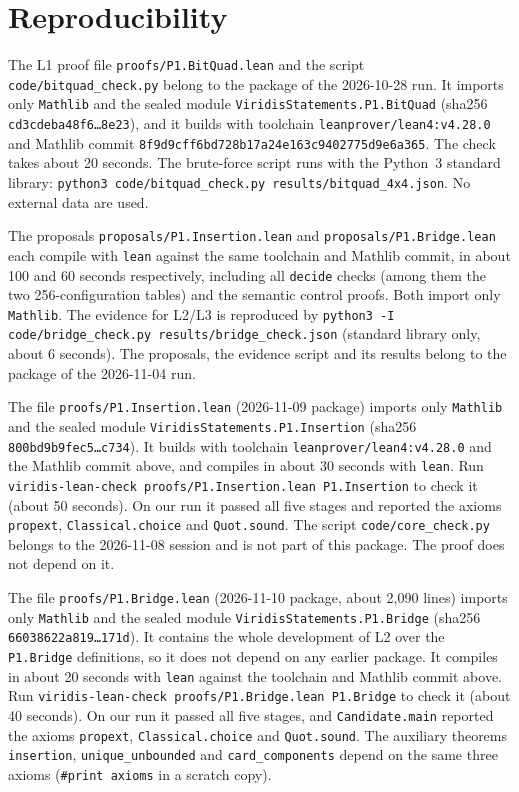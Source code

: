 \documentclass[11pt]{article}
\theoremstyle{definition}
\theoremstyle{remark}
\begin{document}
\section{Reproducibility}
{\sloppy

The L1 proof file \texttt{proofs/P1.BitQuad.lean} and the script
\texttt{code/bitquad\_check.py} belong to the package of the 2026-10-28 run. It imports only
\texttt{Mathlib} and the sealed module \texttt{ViridisStatements.P1.BitQuad}
(sha256 \texttt{cd3cdeba48f6\ldots{}8e23}), and it builds with toolchain
\texttt{leanprover/lean4:v4.28.0} and Mathlib commit
\texttt{8f9d9cff6bd728b17a24e163c9402775d9e6a365}. The check takes about 20
seconds. The brute-force script runs with the Python~3 standard library:
\texttt{python3 code/bitquad\_check.py results/bitquad\_4x4.json}. No external
data are used.

The proposals \texttt{proposals/P1.Insertion.lean} and
\texttt{proposals/P1.Bridge.lean} each compile with \texttt{lean} against the
same toolchain and Mathlib commit, in about 100 and 60 seconds respectively,
including all \texttt{decide} checks (among them the two 256-configuration
tables) and the semantic control proofs. Both import only \texttt{Mathlib}. The evidence
for L2/L3 is reproduced by \texttt{python3 -I code/bridge\_check.py
results/bridge\_check.json} (standard library only, about 6 seconds). The
proposals, the evidence script and its results belong to the package of the
2026-11-04 run.

The file \texttt{proofs/P1.Insertion.lean} (2026-11-09 package) imports only
\texttt{Mathlib} and the sealed module \texttt{ViridisStatements.P1.Insertion}
(sha256 \texttt{800bd9b9fec5\ldots{}c734}). It builds with toolchain
\texttt{leanprover/lean4:v4.28.0} and the Mathlib commit above, and compiles in about
30 seconds with \texttt{lean}. Run
\texttt{viridis-lean-check proofs/P1.Insertion.lean P1.Insertion} to check it
(about 50 seconds). On our run it passed all five stages and reported the axioms
\texttt{propext}, \texttt{Classical.choice} and \texttt{Quot.sound}. The script
\texttt{code/core\_check.py} belongs to the 2026-11-08 session and is not part of
this package. The proof does not depend on it.

The file \texttt{proofs/P1.Bridge.lean} (2026-11-10 package, about 2{,}090 lines) imports only
\texttt{Mathlib} and the sealed module \texttt{ViridisStatements.P1.Bridge}
(sha256 \texttt{66038622a819\ldots{}171d}). It contains the whole development of L2
over the \texttt{P1.Bridge} definitions, so it does not depend on any earlier package.
It compiles in about 20 seconds with \texttt{lean} against the toolchain and Mathlib commit
above. Run \texttt{viridis-lean-check proofs/P1.Bridge.lean P1.Bridge} to check it
(about 40 seconds). On our run it passed all five stages, and \texttt{Candidate.main} reported the
axioms \texttt{propext}, \texttt{Classical.choice} and \texttt{Quot.sound}. The auxiliary
theorems \texttt{insertion}, \texttt{unique\_unbounded} and \texttt{card\_components}
depend on the same three axioms (\texttt{\#print axioms} in a scratch copy).

}
\end{document}
